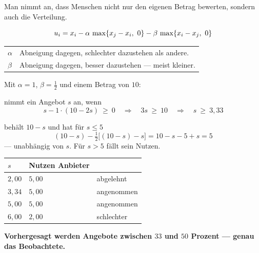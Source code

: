 \begin{merksatz}
Man nimmt an, dass Menschen nicht nur den eigenen Betrag bewerten, sondern auch die Verteilung.

\[ \Aus_i = x_i - \alpha\,\max\{x_j-x_i,\ 0\} - \beta\,\max\{x_i-x_j,\ 0\} \]

\begin{center}
{\small
\renewcommand{\arraystretch}{1.5}
\begin{tabular}{@{}P{1.4cm}P{6.8cm}@{}}
\toprule
$\alpha$ & Abneigung dagegen, schlechter dazustehen als andere.\\
$\beta$ & Abneigung dagegen, besser dazustehen --- meist kleiner.\\
\bottomrule
\end{tabular}}
\end{center}

Mit $\alpha = 1$, $\beta = \tfrac12$ und einem Betrag von $10$:

 nimmt ein Angebot $s$ an, wenn
\[ s - 1\cdot(10-2s) \ \ge\ 0 \quad\Longrightarrow\quad 3s \ \ge\ 10 \quad\Longrightarrow\quad s \ \ge\ 3{,}33 \]

 behält $10-s$ und hat für $s \le 5$
\[ (10-s) - \tfrac12\bigl[(10-s)-s\bigr] = 10-s-5+s = 5 \]
--- unabhängig von $s$. Für $s > 5$ fällt sein Nutzen.

\begin{center}
{\small
\renewcommand{\arraystretch}{1.48}
\begin{tabular}{@{}P{1.8cm}P{2.4cm}P{2.6cm}@{}}
\toprule
$s$ & \textbf{Nutzen Anbieter} & \\
\midrule
$2{,}00$ & $5{,}00$ & \textcolor{akzent}{abgelehnt}\\
$3{,}34$ & $5{,}00$ & angenommen\\
$5{,}00$ & $5{,}00$ & angenommen\\
$6{,}00$ & $2{,}00$ & schlechter\\
\bottomrule
\end{tabular}}
\end{center}

\begin{center}
\begin{minipage}{0.9\textwidth}
\textbf{Vorhergesagt werden Angebote zwischen $33$ und $50$ Prozent --- genau das Beobachtete.}
\end{minipage}
\end{center}

\begin{center}
\begin{minipage}{0.88\textwidth}
\end{minipage}
\end{center}
\end{merksatz}

